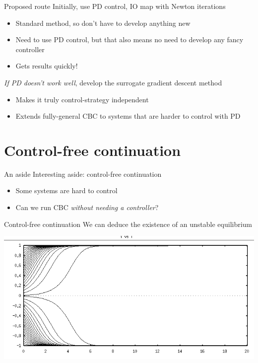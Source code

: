 \documentclass[presentation]{beamer}
\begin{document}
\begin{frame}[label={sec:org7b5feb6}]{Proposed route}
Initially, use PD control, IO map with Newton iterations
\begin{itemize}
\item Standard method, so don't have to develop anything new
\item Need to use PD control, but that also means no need to develop any fancy controller
\item Gets results quickly!
\end{itemize}
\vfill
\emph{If PD doesn't work well}, develop the surrogate gradient descent method
\begin{itemize}
\item Makes it truly control-strategy independent
\item Extends fully-general CBC to systems that are harder to control with PD
\end{itemize}
\end{frame}

\section{Control-free continuation}
\label{sec:org94a0829}
\begin{frame}[label={sec:org4b74bc0}]{An  aside}
Interesting aside: control-free continuation
\vfill
\begin{itemize}
\item Some systems are hard to control
\item Can we run CBC \emph{without needing a controller}?
\end{itemize}
\end{frame}

\begin{frame}[label={sec:orgdbfe774}]{Control-free continuation}
We can deduce the existence of an unstable equilibrium

\begin{center}
\includegraphics[width=.9\linewidth]{./bistable.png}
\end{center}
\end{frame}
\end{document}
